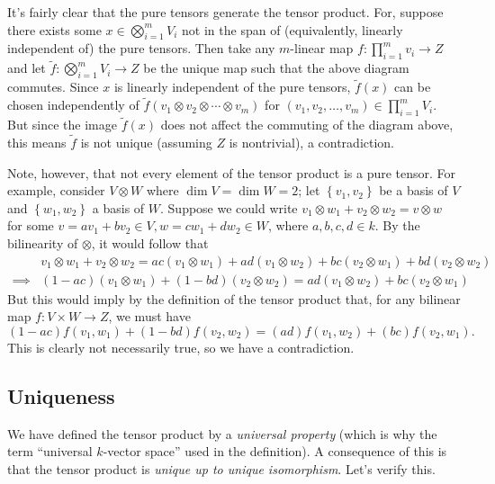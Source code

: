 \begin{rem}
  It's fairly clear that the pure tensors generate the tensor
  product. For, suppose there exists some $x \in \bigotimes_{i=1}^m
  V_i$ not in the span of (equivalently, linearly independent of) the
  pure tensors. Then take any $m$-linear map $f : \prod_{i=1}^m v_i
  \to Z$ and let $\tilde f : \bigotimes_{i=1}^m V_i \to Z$ be the
  unique map such that the above diagram commutes. Since $x$ is
  linearly independent of the pure tensors, $\tilde f(x)$ can be
  chosen independently of $\tilde f(v_1 \otimes v_2 \otimes \cdots
  \otimes v_m)$ for $(v_1,v_2,\ldots,v_m) \in \prod_{i=1}^m V_i$. But
  since the image $\tilde f(x)$ does not affect the commuting of the
  diagram above, this means $\tilde f$ is not unique (assuming $Z$ is
  nontrivial), a contradiction.

  Note, however, that not every element of the tensor product is a
  pure tensor. For example, consider $V \otimes W$ where $\dim V =
  \dim W = 2$; let $\left\{v_1,v_2\right\}$ be a basis of $V$ and
  $\left\{w_1,w_2\right\}$ a basis of $W$. Suppose we could write $v_1
  \otimes w_1 + v_2 \otimes w_2 = v \otimes w$ for some $v = av_1+bv_2
  \in V, w = cw_1+dw_2 \in W$, where $a,b,c,d \in k$. By the
  bilinearity of $\otimes$, it would follow that
  \begin{align*}
    &v_1 \otimes w_1 + v_2 \otimes w_2 = ac(v_1 \otimes w_1) + ad(v_1
    \otimes w_2) + bc(v_2 \otimes w_1) + bd(v_2 \otimes w_2) \\
    \implies & (1-ac)(v_1 \otimes w_1) + (1-bd)(v_2 \otimes w_2) =
    ad(v_1 \otimes w_2) + bc(v_2 \otimes w_1)
  \end{align*}
  But this would imply by the definition of the tensor product that,
  for any bilinear map $f: V \times W \to Z$, we must have
  \[
  (1-ac)f(v_1,w_1) + (1-bd)f(v_2,w_2) = (ad)f(v_1,w_2) +
  (bc)f(v_2,w_1).
  \]
  This is clearly not necessarily true, so we have a contradiction.
\end{rem}

\subsection{Uniqueness}

We have defined the tensor product by a \emph{universal property}
(which is why the term ``universal $k$-vector space'' used in the
definition). A consequence of this is that the tensor product is
\emph{unique up to unique isomorphism}. Let's verify this.


